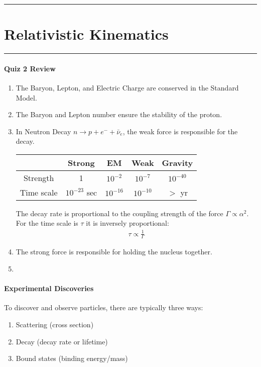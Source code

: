 \documentclass[../main.tex]{subfiles}
\begin{document}
\hrule
\section{Relativistic Kinematics}
\hrule \vspace{10px}


\paragraph{Quiz 2 Review}

\begin{enumerate}
    \item The Baryon, Lepton, and Electric Charge are conserved in the Standard Model. 
    \item The Baryon and Lepton number ensure the stability of the proton.
    \item In Neutron Decay $n \rightarrow p + e^- + \bar \nu_e$, the weak force is responsible for
    the decay.
\begin{center}
    \begin{tabular}{c|c|c|c|c}
        & Strong & EM & Weak & Gravity \\
        \hline
        Strength & 1 & $10^{-2}$ & $10^{-7}$ & $10^{-40}$ \\
        \hline
        Time scale & $10^{-23}$ sec & $10^{-16}$ & $10^{-10}$ & $>$ yr\\
    \end{tabular}
\end{center}
    The decay rate is proportional to the coupling strength of the force $\Gamma \propto \alpha^2$.
    For the time scale is $\tau$ it is inversely proportional:
    \begin{align*}
        \tau \propto \frac{1}{\Gamma}
    \end{align*}
    \item The strong force is responsible for holding the nucleus together.
    \item 
\end{enumerate}

\paragraph{Experimental Discoveries}

To discover and observe particles, there are typically three ways:
\begin{enumerate}
    \item Scattering (cross section) 
    \item Decay (decay rate or lifetime)
    \item Bound states (binding energy/mass)
\end{enumerate}
\end{document}
